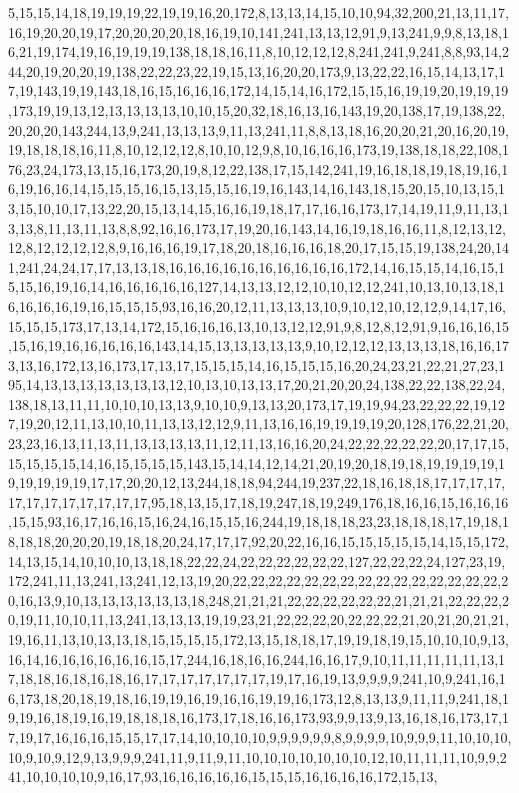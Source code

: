 5,15,15,14,18,19,19,19,22,19,19,16,20,172,8,13,13,14,15,10,10,94,32,200,21,13,11,17,16,19,20,20,19,17,20,20,20,20,18,16,19,10,141,241,13,13,12,91,9,13,241,9,9,8,13,18,16,21,19,174,19,16,19,19,19,138,18,18,16,11,8,10,12,12,12,8,241,241,9,241,8,8,93,14,244,20,19,20,20,19,138,22,22,23,22,19,15,13,16,20,20,173,9,13,22,22,16,15,14,13,17,17,19,143,19,19,143,18,16,15,16,16,16,172,14,15,14,16,172,15,15,16,19,19,20,19,19,19,173,19,19,13,12,13,13,13,13,10,10,15,20,32,18,16,13,16,143,19,20,138,17,19,138,22,20,20,20,143,244,13,9,241,13,13,13,9,11,13,241,11,8,8,13,18,16,20,20,21,20,16,20,19,19,18,18,18,16,11,8,10,12,12,12,8,10,10,12,9,8,10,16,16,16,173,19,138,18,18,22,108,176,23,24,173,13,15,16,173,20,19,8,12,22,138,17,15,142,241,19,16,18,18,19,18,19,16,16,19,16,16,14,15,15,15,16,15,13,15,15,16,19,16,143,14,16,143,18,15,20,15,10,13,15,13,15,10,10,17,13,22,20,15,13,14,15,16,16,19,18,17,17,16,16,173,17,14,19,11,9,11,13,13,13,8,11,13,11,13,8,8,92,16,16,173,17,19,20,16,143,14,16,19,18,16,16,11,8,12,13,12,12,8,12,12,12,12,8,9,16,16,16,19,17,18,20,18,16,16,16,18,20,17,15,15,19,138,24,20,141,241,24,24,17,17,13,13,18,16,16,16,16,16,16,16,16,16,16,172,14,16,15,15,14,16,15,15,15,16,19,16,14,16,16,16,16,16,127,14,13,13,12,12,10,10,12,12,241,10,13,10,13,18,16,16,16,16,19,16,15,15,15,93,16,16,20,12,11,13,13,13,10,9,10,12,10,12,12,9,14,17,16,15,15,15,173,17,13,14,172,15,16,16,16,13,10,13,12,12,91,9,8,12,8,12,91,9,16,16,16,15,15,16,19,16,16,16,16,16,143,14,15,13,13,13,13,13,9,10,12,12,12,13,13,13,18,16,16,173,13,16,172,13,16,173,17,13,17,15,15,15,14,16,15,15,15,16,20,24,23,21,22,21,27,23,195,14,13,13,13,13,13,13,13,12,10,13,10,13,13,17,20,21,20,20,24,138,22,22,138,22,24,138,18,13,11,11,10,10,10,13,13,9,10,10,9,13,13,20,173,17,19,19,94,23,22,22,22,19,127,19,20,12,11,13,10,10,11,13,13,12,12,9,11,13,16,16,19,19,19,19,20,128,176,22,21,20,23,23,16,13,11,13,11,13,13,13,13,11,12,11,13,16,16,20,24,22,22,22,22,22,20,17,17,15,15,15,15,15,14,16,15,15,15,15,143,15,14,14,12,14,21,20,19,20,18,19,18,19,19,19,19,19,19,19,19,19,17,17,20,20,12,13,244,18,18,94,244,19,237,22,18,16,18,18,17,17,17,17,17,17,17,17,17,17,17,17,95,18,13,15,17,18,19,247,18,19,249,176,18,16,16,15,16,16,16,15,15,93,16,17,16,16,15,16,24,16,15,15,16,244,19,18,18,18,23,23,18,18,18,17,19,18,18,18,18,20,20,20,19,18,18,20,24,17,17,17,92,20,22,16,16,15,15,15,15,15,14,15,15,172,14,13,15,14,10,10,10,13,18,18,22,22,24,22,22,22,22,22,22,127,22,22,22,24,127,23,19,172,241,11,13,241,13,241,12,13,19,20,22,22,22,22,22,22,22,22,22,22,22,22,22,22,22,20,16,13,9,10,13,13,13,13,13,13,18,248,21,21,21,22,22,22,22,22,22,21,21,21,22,22,22,20,19,11,10,10,11,13,241,13,13,13,19,19,23,21,22,22,22,20,22,22,22,21,20,21,20,21,21,19,16,11,13,10,13,13,18,15,15,15,15,172,13,15,18,18,17,19,19,18,19,15,10,10,10,9,13,16,14,16,16,16,16,16,16,15,17,244,16,18,16,16,244,16,16,17,9,10,11,11,11,11,11,13,17,18,18,16,18,16,18,16,17,17,17,17,17,17,17,19,17,16,19,13,9,9,9,9,241,10,9,241,16,16,173,18,20,18,19,18,16,19,19,16,19,16,16,19,19,16,173,12,8,13,13,9,11,11,9,241,18,19,19,16,18,19,16,19,18,18,18,16,173,17,18,16,16,173,93,9,9,13,9,13,16,18,16,173,17,17,19,17,16,16,16,15,15,17,17,14,10,10,10,10,9,9,9,9,9,9,8,9,9,9,9,10,9,9,9,11,10,10,10,10,9,10,9,12,9,13,9,9,9,241,11,9,11,9,11,10,10,10,10,10,10,10,12,10,11,11,11,10,9,9,241,10,10,10,10,9,16,17,93,16,16,16,16,16,15,15,15,16,16,16,16,172,15,13,